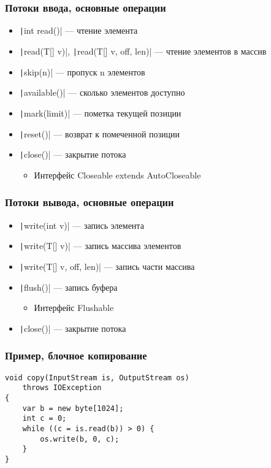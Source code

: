 \documentclass[xetex,mathserif,serif]{beamer}
\begin{document}
	\begin{frame}
		\frametitle{Потоки ввода, основные операции}
		\begin{itemize}
			\item \texttt|int read()| --- чтение элемента
			\item \texttt|read(T[] v)|, \texttt|read(T[] v, off, len)| --- чтение элементов в массив
			\item \texttt|skip(n)| --- пропуск n элементов
			\item \texttt|available()| --- сколько элементов доступно
			\item \texttt|mark(limit)| --- пометка текущей позиции
			\item \texttt|reset()| --- возврат к помеченной позиции
			\item \texttt|close()| --- закрытие потока
			\begin{itemize}
				\item Интерфейс Closeable extends AutoCloseable
			\end{itemize}
		\end{itemize}
	\end{frame}

	\begin{frame}
		\frametitle{Потоки вывода, основные операции}
		\begin{itemize}
			\item \texttt|write(int v)| --- запись элемента
			\item \texttt|write(T[] v)| --- запись массива элементов
			\item \texttt|write(T[] v, off, len)| --- запись части массива
			\item \texttt|flush()| --- запись буфера
			\begin{itemize}
				\item Интерфейс Flushable
			\end{itemize}
			\item \texttt|close()| --- закрытие потока
		\end{itemize}
	\end{frame}

	\begin{frame}[fragile]
		\frametitle{Пример, блочное копирование}
		\begin{verbatim}
void copy(InputStream is, OutputStream os)
    throws IOException
{
    var b = new byte[1024];
    int c = 0;
    while ((c = is.read(b)) > 0) {
        os.write(b, 0, c);
    }
}
		\end{verbatim}
	\end{frame}
\end{document}
